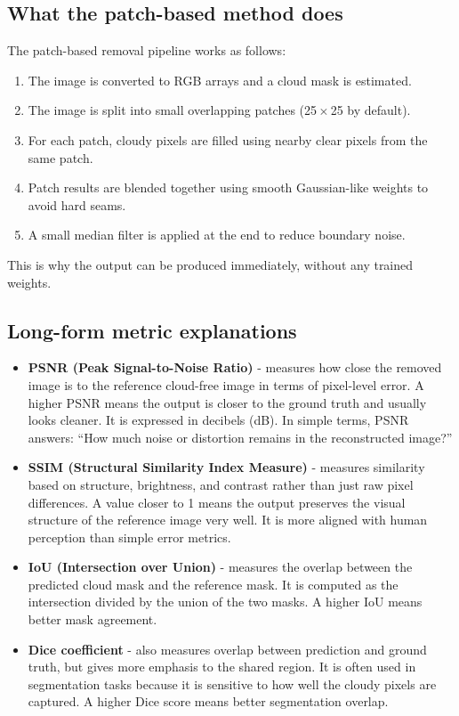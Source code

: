 \documentclass[11pt,a4paper]{article}
\begin{document}
\subsection{What the patch-based method does}
The patch-based removal pipeline works as follows:
\begin{enumerate}
  \item The image is converted to RGB arrays and a cloud mask is estimated.
  \item The image is split into small overlapping patches (25\,\ensuremath{\times}\,25 by default).
  \item For each patch, cloudy pixels are filled using nearby clear pixels from the same patch.
  \item Patch results are blended together using smooth Gaussian-like weights to avoid hard seams.
  \item A small median filter is applied at the end to reduce boundary noise.
\end{enumerate}
This is why the output can be produced immediately, without any trained weights.

\subsection{Long-form metric explanations}
\begin{itemize}
  \item \textbf{PSNR (Peak Signal-to-Noise Ratio)} - measures how close the removed image is to the reference cloud-free image in terms of pixel-level error. A higher PSNR means the output is closer to the ground truth and usually looks cleaner. It is expressed in decibels (dB). In simple terms, PSNR answers: ``How much noise or distortion remains in the reconstructed image?''
  \item \textbf{SSIM (Structural Similarity Index Measure)} - measures similarity based on structure, brightness, and contrast rather than just raw pixel differences. A value closer to 1 means the output preserves the visual structure of the reference image very well. It is more aligned with human perception than simple error metrics.
  \item \textbf{IoU (Intersection over Union)} - measures the overlap between the predicted cloud mask and the reference mask. It is computed as the intersection divided by the union of the two masks. A higher IoU means better mask agreement.
  \item \textbf{Dice coefficient} - also measures overlap between prediction and ground truth, but gives more emphasis to the shared region. It is often used in segmentation tasks because it is sensitive to how well the cloudy pixels are captured. A higher Dice score means better segmentation overlap.
\end{itemize}
\end{document}
